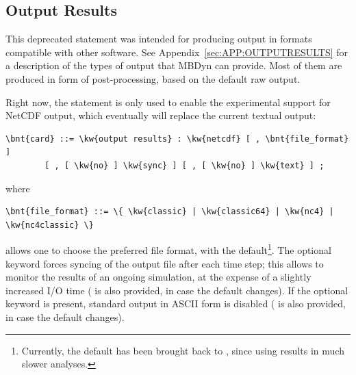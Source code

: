\subsection{Output Results}\label{sec:CONTROLDATA:NETCDF}
This deprecated statement was intended for producing output in formats
compatible with other software.
See Appendix~\ref{sec:APP:OUTPUTRESULTS} for a description of the types
of output that MBDyn can provide.
Most of them are produced in form of post-processing, based on the default
raw output.

Right now, the  statement is only used to enable
the experimental support for NetCDF output, which eventually
will replace the current textual output:
\begin{Verbatim}[commandchars=\\\{\}]
    \bnt{card} ::= \kw{output results} : \kw{netcdf} [ , \bnt{file_format} ]
        [ , [ \kw{no} ] \kw{sync} ] [ , [ \kw{no} ] \kw{text} ] ;
\end{Verbatim}
where
\begin{Verbatim}[commandchars=\\\{\}]
    \bnt{file_format} ::= \{ \kw{classic} | \kw{classic64} | \kw{nc4} | \kw{nc4classic} \}
\end{Verbatim}
allows one to choose the preferred file format, with  the default\footnote{%
Currently, the default has been brought back to , since using  results in much slower analyses.
}.
The optional  keyword forces syncing of the
output file after each time step; this allows to monitor the results of an ongoing simulation, 
at the expense of a slightly increased I/O time ( is also provided, in case the default changes).
If the optional keyword  is present,
standard output in ASCII form is disabled ( is also provided, in case the default changes).

